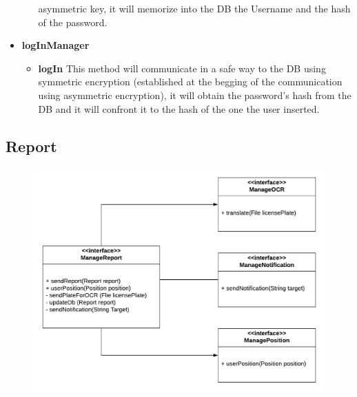 \documentclass[12pt,a4paper]{report}
\begin{document}
\begin{itemize}
\begin{itemize}
								asymmetric key, it will memorize into the DB the Username and the hash of the
								password.
						\end{itemize}
						\item \textbf{logInManager}
						\begin{itemize}
							\item \textbf{logIn} This method will communicate in a safe way to the DB using
								symmetric encryption (established at the begging of the communication using
								asymmetric encryption), it will obtain the password's hash from the DB and it will
								confront it to the hash of the one the user inserted.
						\end{itemize}
					\end{itemize}
			\subsection{Report}
				\begin{figure}[H]
						\includegraphics[width = \textwidth, center]{reportInterface}
						\label{fig: interfaces}
				\end{figure}
\end{document}
